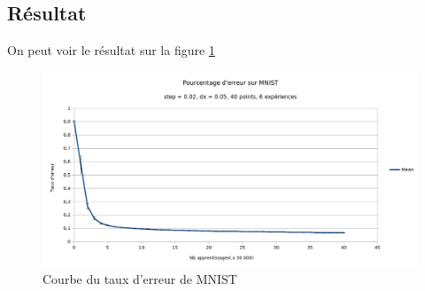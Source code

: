 \subsection{Résultat}
On peut voir le résultat sur la figure \ref{fig:res_MNIST}
\begin{figure}[h]
\begin{center}
\includegraphics[width=1\textwidth]{images/courbe_MNIST.png}
\caption{Courbe du taux d'erreur de MNIST}
\label{fig:res_MNIST}
\end{center}
\end{figure}
